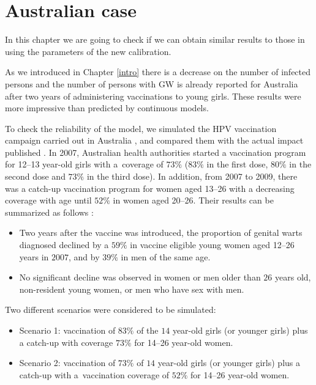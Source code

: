 \chapter{Australian case}\label{Australiano}

In this chapter we are going to check if we can obtain similar results to those in \cite{ali2013genital,fairley2009rapid} using the parameters of the new calibration.

As we introduced in Chapter \ref{intro} there is a decrease on the number of infected persons and the number of persons with GW is already reported for Australia after two years of administering vaccinations to young girls. These results were more impressive than predicted by continuous models.

To check the reliability of the model, we simulated the HPV vaccination campaign carried out in Australia \cite{ali2013genital}, and compared them with the actual impact published \cite{ali2013genital}. In 2007, Australian health authorities started a vaccination program for 12--13 year-old girls with a~coverage of $73\%$ ($83\%$ in the first dose, $80\%$ in the second dose and $73\%$ in the third dose). In addition, from 2007 to 2009, there was a catch-up vaccination program for women aged 13--26 with a decreasing coverage with age until $52\%$ in women aged 20--26. Their results can be summarized as follows \cite{ali2013genital}:

\begin{itemize}
	\item Two years after the vaccine was introduced, the proportion of genital warts diagnosed declined by a $59\%$ in vaccine eligible young women aged 12--26 years in $2007$, and by $39\%$ in men of the same age.
	\item No significant decline was observed in women or men older than $26$ years old, non-resident young women, or men who have sex with men.
\end{itemize}

Two different scenarios were considered to be simulated:

\begin{itemize}
	\item Scenario 1: vaccination of $83\%$ of the $14$ year-old girls (or younger girls) plus a catch-up with coverage $73\%$ for 14--26 year-old women.
	\item Scenario 2: vaccination of $73\%$ of $14$ year-old girls (or younger girls) plus a catch-up with a~vaccination coverage of $52\%$ for 14--26 year-old women.
\end{itemize}

